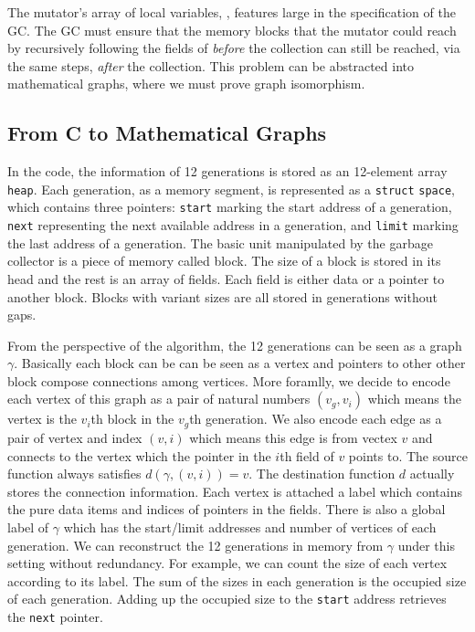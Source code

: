 The mutator's array of local variables, , features large in the specification 
of the GC. The GC must ensure that the memory blocks that the mutator 
could reach by recursively following the fields of  \emph{before} the 
collection can still be reached, via the same steps, \emph{after} the collection.
This problem can be abstracted into mathematical graphs,
where we must prove graph isomorphism.

\subsection{From C to Mathematical Graphs}
\label{sec:movetomathgraph}
In the code, the information of 12 generations is stored as an
12-element array \texttt{heap}. Each generation, as a memory segment,
is represented as a \texttt{struct} \texttt{space}, which contains
three pointers: \texttt{start} marking the start address of a
generation, \texttt{next} representing the next available address in a
generation, and \texttt{limit} marking the last address of a
generation. The basic unit manipulated by the garbage collector is a
piece of memory called block. The size of a block is stored in its
head and the rest is an array of fields. Each field is either data or
a pointer to another block. Blocks with variant sizes are all stored
in generations without gaps.

From the perspective of the algorithm, the 12 generations can be seen
as a graph $\gamma$. Basically each block can be can be seen as a
vertex and pointers to other other block compose connections among
vertices. More foramlly, we decide to encode each vertex of this graph
as a pair of natural numbers $(v_g, v_i)$ which means the vertex is
the $v_i$th block in the $v_g$th generation. We also encode each edge
as a pair of vertex and index $(v, i)$ which means this edge is from
vectex $v$ and connects to the vertex which the pointer in the $i$th
field of $v$ points to. The source function always satisfies
$d(\gamma, (v, i)) = v$. The destination function $d$ actually stores
the connection information. Each vertex is attached a label which
contains the pure data items and indices of pointers in the
fields. There is also a global label of $\gamma$ which has the
start/limit addresses and number of vertices of each generation. We
can reconstruct the 12 generations in memory from $\gamma$ under this
setting without redundancy. For example, we can count the size of each
vertex according to its label. The sum of the sizes in each generation
is the occupied size of each generation. Adding up the occupied size
to the
\texttt{start} address retrieves the \texttt{next} pointer.

